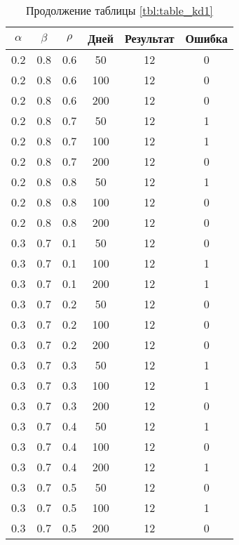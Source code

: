 \begin{table}[h]
	\begin{center}
        \begin{threeparttable}
        \captionsetup{justification=raggedright,singlelinecheck=off}
		\caption*{Продолжение таблицы \ref{tbl:table_kd1}}
		\begin{tabular}{|c|c|c|c|c|c|}
  	\hline
	$\alpha$ & $\beta$ & $\rho$ & Дней & Результат & Ошибка \\
   \hline
	0.2 &  0.8 &  0.6 &   50 &    12 &     0 \\
	0.2 &  0.8 &  0.6 &  100 &    12 &     0 \\
	0.2 &  0.8 &  0.6 &  200 &    12 &     0 \\
   \hline
	0.2 &  0.8 &  0.7 &   50 &    12 &     1 \\
	0.2 &  0.8 &  0.7 &  100 &    12 &     1 \\
	0.2 &  0.8 &  0.7 &  200 &    12 &     0 \\
   \hline
	0.2 &  0.8 &  0.8 &   50 &    12 &     1 \\
	0.2 &  0.8 &  0.8 &  100 &    12 &     0 \\
	0.2 &  0.8 &  0.8 &  200 &    12 &     0 \\
   \hline
	0.3 &  0.7 &  0.1 &   50 &    12 &     0 \\
	0.3 &  0.7 &  0.1 &  100 &    12 &     1 \\
	0.3 &  0.7 &  0.1 &  200 &    12 &     1 \\
   \hline
	0.3 &  0.7 &  0.2 &   50 &    12 &     0 \\
	0.3 &  0.7 &  0.2 &  100 &    12 &     0 \\
	0.3 &  0.7 &  0.2 &  200 &    12 &     0 \\
   \hline
	0.3 &  0.7 &  0.3 &   50 &    12 &     1 \\
	0.3 &  0.7 &  0.3 &  100 &    12 &     1 \\
	0.3 &  0.7 &  0.3 &  200 &    12 &     0 \\
   \hline
	0.3 &  0.7 &  0.4 &   50 &    12 &     1 \\
	0.3 &  0.7 &  0.4 &  100 &    12 &     0 \\
	0.3 &  0.7 &  0.4 &  200 &    12 &     1 \\
   \hline
	0.3 &  0.7 &  0.5 &   50 &    12 &     0 \\
	0.3 &  0.7 &  0.5 &  100 &    12 &     1 \\
	0.3 &  0.7 &  0.5 &  200 &    12 &     0 \\

\end{tabular}
\end{threeparttable}
\end{center}
\end{table}
